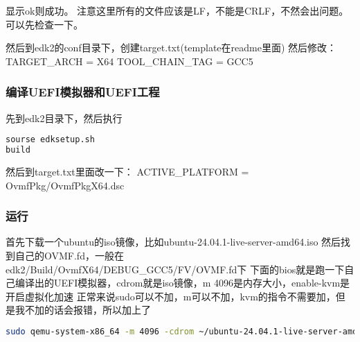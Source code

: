显示ok则成功。
注意这里所有的文件应该是LF，不能是CRLF，不然会出问题。可以先检查一下。

然后到edk2的conf目录下，创建target.txt(template在readme里面)
然后修改：
TARGET\_ARCH           = X64
TOOL\_CHAIN\_TAG        = GCC5

\subsubsection{编译UEFI模拟器和UEFI工程}
先到edk2目录下，然后执行
\begin{lstlisting}[language=bash]
sourse edksetup.sh
build
\end{lstlisting}

然后到target.txt里面改一下：
ACTIVE\_PLATFORM       = OvmfPkg/OvmfPkgX64.dsc

\subsubsection{运行}
首先下载一个ubuntu的iso镜像，比如ubuntu-24.04.1-live-server-amd64.iso
然后找到自己的OVMF.fd，一般在edk2/Build/OvmfX64/DEBUG\_GCC5/FV/OVMF.fd下
下面的bios就是跑一下自己编译出的UEFI模拟器，cdrom就是iso镜像，m 4096是内存大小，enable-kvm是开启虚拟化加速
正常来说sudo可以不加，m可以不加，kvm的指令不需要加，但是我不加的话会报错，所以加上了
\begin{lstlisting}[language=bash]
sudo qemu-system-x86_64 -m 4096 -cdrom ~/ubuntu-24.04.1-live-server-amd64.iso -bios ~/OVMF.fd -enable-kvm
\end{lstlisting}
